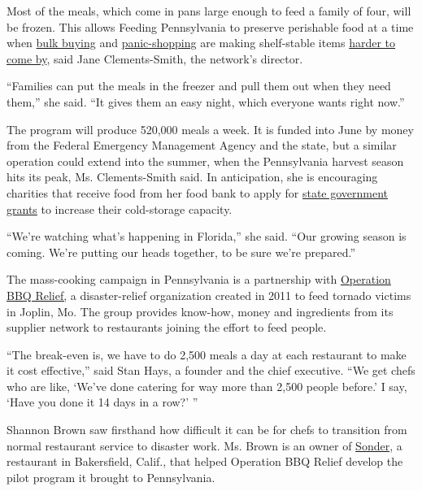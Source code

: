 Most of the meals, which come in pans large enough to feed a family of
four, will be frozen. This allows Feeding Pennsylvania to preserve
perishable food at a time when
\href{https://www.nytimes3xbfgragh.onion/2020/05/11/dining/bulk-food-buying-coronavirus.html}{bulk
buying} and
\href{https://www.nytimes3xbfgragh.onion/2020/03/31/smarter-living/wirecutter/dont-overdo-the-coronavirus-stockpiling.html}{panic-shopping}
are making shelf-stable items
\href{https://www.nytimes3xbfgragh.onion/2020/05/11/nyregion/Coronavirus-supermarkets-items-missing.html}{harder
to come by}, said Jane Clements-Smith, the network's director.

``Families can put the meals in the freezer and pull them out when they
need them,'' she said. ``It gives them an easy night, which everyone
wants right now.''

The program will produce 520,000 meals a week. It is funded into June by
money from the Federal Emergency Management Agency and the state, but a
similar operation could extend into the summer, when the Pennsylvania
harvest season hits its peak, Ms. Clements-Smith said. In anticipation,
she is encouraging charities that receive food from her food bank to
apply for
\href{https://www.dep.pa.gov/Business/Land/Waste/Recycling/Municipal-Resources/FinancialAssistance/Pages/default.aspx}{state
government grants} to increase their cold-storage capacity.

``We're watching what's happening in Florida,'' she said. ``Our growing
season is coming. We're putting our heads together, to be sure we're
prepared.''

The mass-cooking campaign in Pennsylvania is a partnership with
\href{https://operationbbqrelief.org/}{Operation BBQ Relief,} a
disaster-relief organization created in 2011 to feed tornado victims in
Joplin, Mo. The group provides know-how, money and ingredients from its
supplier network to restaurants joining the effort to feed people.

``The break-even is, we have to do 2,500 meals a day at each restaurant
to make it cost effective,'' said Stan Hays, a founder and the chief
executive. ``We get chefs who are like, `We've done catering for way
more than 2,500 people before.' I say, `Have you done it 14 days in a
row?' ''

Shannon Brown saw firsthand how difficult it can be for chefs to
transition from normal restaurant service to disaster work. Ms. Brown is
an owner of \href{http://www.sonderbakersfield.com/}{Sonder}, a
restaurant in Bakersfield, Calif., that helped Operation BBQ Relief
develop the pilot program it brought to Pennsylvania.

